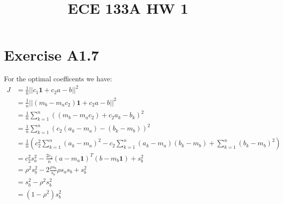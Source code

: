 
\title{ECE 133A HW 1}

\maketitle
\section*{Exercise A1.7}
For the optimal coefficents we have:
\begin{align*}
    J&=\frac{1}{n}||c_1\textbf{1}+c_2a-b||^2\\
    &=\frac{1}{n}||(m_b-m_ac_2)\textbf{1}+c_2a-b||^2\\
    &=\frac{1}{n}\sum_{k=1}^n((m_b-m_ac_2)+c_2a_k-b_k)^2\\
    &=\frac{1}{n}\sum_{k=1}^n(c_2(a_k-m_a)-(b_k-m_b))^2\\
    &=\frac{1}{n}\left(c_2^2\sum_{k=1}^n(a_k-m_a)^2-c_2\sum_{k=1}^n(a_k-m_a)(b_k-m_b) +\sum_{k=1}^n(b_k-m_b)^2\right)\\
    &=c_2^2s_a^2-\frac{2c_2}{n}(a-m_a\textbf{1})^T(b-m_b\textbf{1})+s_b^2\\
    &=\rho^2s_b^2-2\frac{\rho s_b}{s_a}\rho s_a s_b+s_b^2\\
    &=s_b^2-\rho^2 s_b^2\\
    &=\boxed{(1-\rho^2)s_b^2}
\end{align*}
